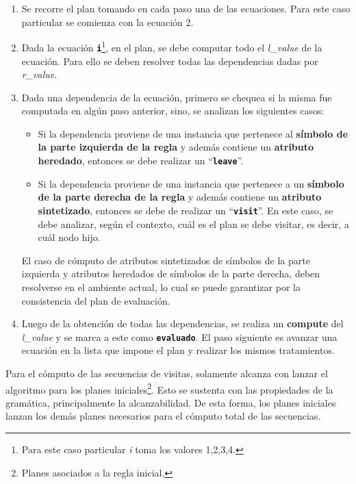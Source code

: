 \documentclass[runningheads,a4paper]{llncs}
\newcommand{\textbtt}[1]{\texttt{\textbf{#1}}}
\begin{document}
\begin{enumerate}
\item Se recorre el plan tomando en cada paso una de las ecuaciones. Para este caso particular se comienza con la ecuación 2.

\item Dada la ecuación \textbtt{i}\footnote{Para este caso particular \textit{i} toma los valores 1,2,3,4.}, en el plan, se debe computar todo el \textit{l\_value} de la ecuación. Para ello se deben resolver todas las dependencias dadas por \textit{r\_value}.

\item Dada una dependencia de la ecuación, primero se chequea si la misma fue computada en algún paso anterior, sino, se analizan los siguientes casos:

\begin{itemize}
\item Si la dependencia proviene de una instancia que pertenece al \textbf{símbolo de la parte izquierda de la regla} y además contiene un \textbf{atributo heredado}, entonces se debe realizar un ``\textbtt{leave}''.

\item Si la dependencia proviene de una instancia que pertenece a un \textbf{símbolo de la parte derecha de la regla} y además contiene un \textbf{atributo sintetizado}, entonces se debe de realizar un ``\textbtt{visit}''. En este caso, se debe analizar, según el contexto, cuál es el plan se debe visitar, es decir, a cuál nodo hijo. 
\end{itemize}

El caso de cómputo de atributos sintetizados de símbolos de la parte izquierda y atributos heredados de símbolos de la parte derecha, deben resolverse en el ambiente actual, lo cual se puede garantizar por la consistencia del plan de evaluación.

\item Luego de la obtención de todas las dependencias, se realiza un \textbf{compute} del \textit{l\_value} y se marca a este como \textbtt{evaluado}. El paso siguiente es avanzar una ecuación en la lista que impone el plan y realizar los mismos tratamientos.
\end{enumerate}

Para el cómputo de las secuencias de visitas, solamente alcanza con lanzar el algoritmo para los planes iniciales\footnote{Planes asociados a la regla inicial.}. Esto se sustenta con las propiedades de la gramática, principalmente la alcanzabilidad. De esta forma, los planes iniciales lanzan los demás planes necesarios para el cómputo total de las secuencias.
\end{document}
